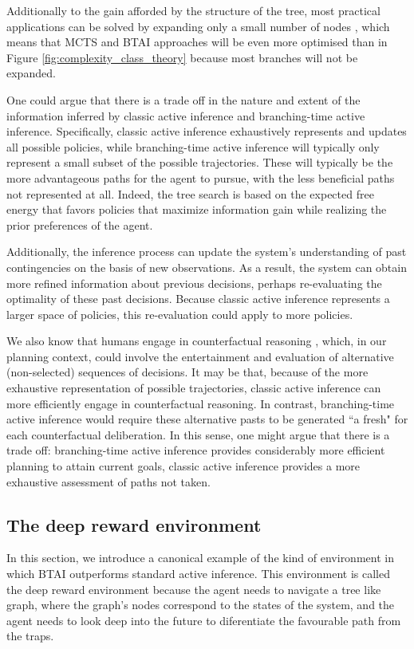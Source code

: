 \documentclass[twoside,11pt]{article}
\begin{document}
Additionally to the gain afforded by the structure of the tree, most practical applications can be solved by expanding only a small number of nodes \citep{Go,MuZero}, which means that MCTS and BTAI approaches will be even more optimised than in Figure \ref{fig:complexity_class_theory} because most branches will not be expanded.

One could argue that there is a trade off in the nature and extent of the information inferred by classic active inference and branching-time active inference. Specifically, classic active inference exhaustively represents and updates all possible policies, while branching-time active inference will typically only represent a small subset of the possible trajectories. These will typically be the more advantageous paths for the agent to pursue, with the less beneficial paths not represented at all. Indeed, the tree search is based on the expected free energy that favors policies that maximize information gain while realizing the prior preferences of the agent.

Additionally, the inference process can update the system's understanding of past contingencies on the basis of new observations. As a result, the system can obtain more refined information about previous decisions, perhaps re-evaluating the optimality of these past decisions. Because classic active inference represents a larger space of policies, this re-evaluation could apply to more policies.

We also know that humans engage in counterfactual reasoning \citep{rafetseder2013counterfactual}, which, in our planning context, could involve the entertainment and evaluation of alternative (non-selected) sequences of decisions. It may be that, because of the more exhaustive representation of possible trajectories, classic active inference can more efficiently engage in counterfactual reasoning. In contrast, branching-time active inference would require these alternative pasts to be generated ``a fresh" for each counterfactual deliberation. In this sense, one might argue that there is a trade off: branching-time active inference provides considerably more efficient planning to attain current goals, classic active inference provides a more exhaustive assessment of paths not taken. 

\subsection{The deep reward environment}

In this section, we introduce a canonical example of the kind of environment in which BTAI outperforms standard active inference. This environment is called the deep reward environment because the agent needs to navigate a tree like graph, where the graph's nodes correspond to the states of the system, and the agent needs to look deep into the future to diferentiate the favourable path from the traps.
\end{document}
